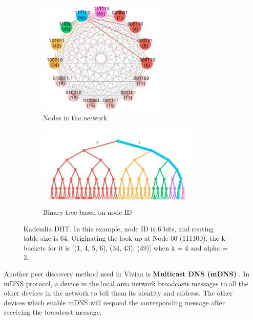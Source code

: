 \begin{figure}[h]
    \centering
    \begin{subfigure}[t]{0.45\textwidth}
        \centering
        \includegraphics[width=0.7\textwidth,trim={0 0 0 0},clip]{figs/kad_k_bucket.png}
        \centering
        \caption{Nodes in the network}
    \end{subfigure}
    \centering
    \begin{subfigure}[b]{0.45\textwidth}
        \centering
        \includegraphics[width=0.9\textwidth,trim={0 0 0 -1.0cm},clip]{figs/kad_binary_tree.png}
        \centering
        \caption{Binary tree based on node ID}
    \end{subfigure}
    \caption{Kademlia DHT. In this example, node ID is 6 bits, and routing table size is 64. Originating the look-up at Node 60 (111100), the k-buckets for it is [(1, 4, 5, 6), (34, 43), (49)] when k = 4 and alpha = 3.}
    \label{fig:kad_dht}
\end{figure}

Another peer discovery method used in Vivian is \textbf{Multicast DNS (mDNS)} \cite{cheshire2013multicast}. In mDNS protocol, a device in the local area network broadcasts messages to all the other devices in the network to tell them its identity and address. The other devices which enable mDNS will respond the corresponding message after receiving the broadcast message.

